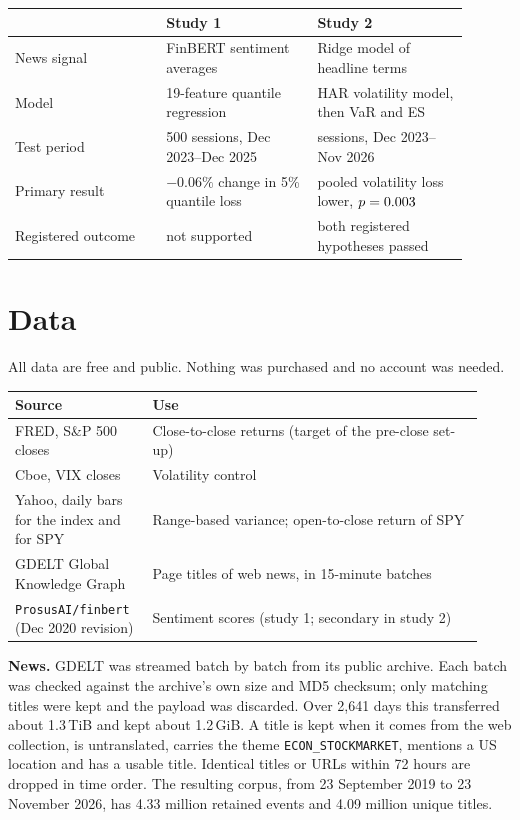 \documentclass[11pt,a4paper]{article}
\begin{document}
\begin{center}
\begin{tabular}{@{}p{0.30\linewidth}p{0.30\linewidth}p{0.30\linewidth}@{}}
\toprule
 & \textbf{Study 1} & \textbf{Study 2} \\
\midrule
News signal & FinBERT sentiment averages & Ridge model of headline terms \\
Model & 19-feature quantile regression & HAR volatility model, then VaR and ES \\
Test period & 500 sessions, Dec 2023--Dec 2025 & \PooledHoldQlikeN{} sessions, Dec 2023--Nov 2026 \\
Primary result & $-0.06\%$ change in 5\% quantile loss & pooled volatility loss lower, $p=0.003$ \\
Registered outcome & not supported & both registered hypotheses passed \\
\bottomrule
\end{tabular}
\end{center}

\section{Data}

All data are free and public. Nothing was purchased and no account was needed.

\begin{center}
\begin{tabular}{@{}p{0.27\linewidth}p{0.66\linewidth}@{}}
\toprule
\textbf{Source} & \textbf{Use} \\
\midrule
FRED, S\&P 500 closes & Close-to-close returns (target of the pre-close set-up) \\
Cboe, VIX closes & Volatility control \\
Yahoo, daily bars for the index and for SPY & Range-based variance; open-to-close return of SPY \\
GDELT Global Knowledge Graph & Page titles of web news, in 15-minute batches \\
\texttt{ProsusAI/finbert} (Dec 2020 revision) & Sentiment scores (study 1; secondary in study 2) \\
\bottomrule
\end{tabular}
\end{center}

\textbf{News.} GDELT was streamed batch by batch from its public archive. Each batch was checked
against the archive's own size and MD5 checksum; only matching titles were kept and the payload
was discarded. Over 2,641 days this transferred about 1.3\,TiB and kept about 1.2\,GiB.
A title is kept when it comes from the web collection, is untranslated, carries the theme
\texttt{ECON\_STOCKMARKET}, mentions a US location and has a usable title. Identical titles or
URLs within 72 hours are dropped in time order. The resulting corpus, from 23 September 2019 to
23 November 2026, has 4.33 million retained events and 4.09 million unique titles.
\end{document}
